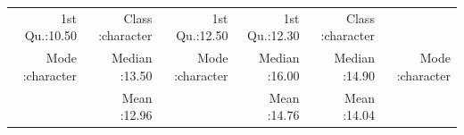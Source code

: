 \documentclass[
]{article}
\begin{document}
\begin{longtable}[]{@{}rrrrrr@{}}
\begin{minipage}[t]{0.12\columnwidth}
1st Qu.:10.50\strut
\end{minipage} & \begin{minipage}[t]{0.15\columnwidth}\raggedleft
Class :character\strut
\end{minipage} & \begin{minipage}[t]{0.12\columnwidth}\raggedleft
1st Qu.:12.50\strut
\end{minipage} & \begin{minipage}[t]{0.12\columnwidth}\raggedleft
1st Qu.:12.30\strut
\end{minipage} & \begin{minipage}[t]{0.15\columnwidth}\raggedleft
Class :character\strut
\end{minipage}\tabularnewline
\begin{minipage}[t]{0.16\columnwidth}\raggedleft
Mode :character\strut
\end{minipage} & \begin{minipage}[t]{0.12\columnwidth}\raggedleft
Median :13.50\strut
\end{minipage} & \begin{minipage}[t]{0.15\columnwidth}\raggedleft
Mode :character\strut
\end{minipage} & \begin{minipage}[t]{0.12\columnwidth}\raggedleft
Median :16.00\strut
\end{minipage} & \begin{minipage}[t]{0.12\columnwidth}\raggedleft
Median :14.90\strut
\end{minipage} & \begin{minipage}[t]{0.15\columnwidth}\raggedleft
Mode :character\strut
\end{minipage}\tabularnewline
\begin{minipage}[t]{0.16\columnwidth}\raggedleft
\strut
\end{minipage} & \begin{minipage}[t]{0.12\columnwidth}\raggedleft
Mean :12.96\strut
\end{minipage} & \begin{minipage}[t]{0.15\columnwidth}\raggedleft
\strut
\end{minipage} & \begin{minipage}[t]{0.12\columnwidth}\raggedleft
Mean :14.76\strut
\end{minipage} & \begin{minipage}[t]{0.12\columnwidth}\raggedleft
Mean :14.04\strut
\end{minipage} & \begin{minipage}[t]{0.15\columnwidth}\raggedleft

\end{minipage}
\end{longtable}
\end{document}
